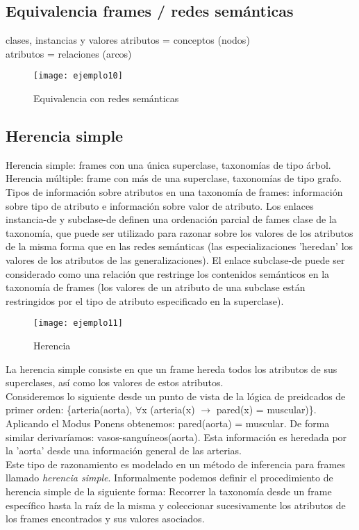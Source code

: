 \documentclass[12pt]{article}
\begin{document}
\subsection{Equivalencia frames / redes semánticas}
clases, instancias y valores atributos = conceptos (nodos)\\
atributos = relaciones (arcos)

\begin{figure}[H]
\centering
\texttt{[image: ejemplo10]}
\caption{Equivalencia con redes semánticas}
\label{fig:ejemplo10}
\end{figure}

\subsection{Herencia simple}
Herencia simple: frames con una única superclase, taxonomías de tipo árbol. Herencia múltiple: frame con más de una superclase, taxonomías de tipo grafo. Tipos de información sobre atributos en una taxonomía de frames: información sobre tipo de atributo e información sobre valor de atributo. Los enlaces instancia-de y subclase-de definen una ordenación parcial de fames clase de la taxonomía, que puede ser utilizado para razonar sobre los valores de los atributos de la misma forma que en las redes semánticas (las especializaciones 'heredan' los valores de los atributos de las generalizaciones). El enlace subclase-de puede ser considerado como una relación que restringe los contenidos semánticos en la taxonomía de frames (los valores de un atributo de una subclase están restringidos por el tipo de atributo especificado en la superclase).

\begin{figure}[H]
\centering
\texttt{[image: ejemplo11]}
\caption{Herencia}
\label{fig:ejemplo11}
\end{figure}

La herencia simple consiste en que un frame hereda todos los atributos de sus superclases, así como los valores de estos atributos.\\
Consideremos lo siguiente desde un punto de vista de la lógica de preidcados de primer orden: \{arteria(aorta), $\forall$x (arteria(x) $\rightarrow$ pared(x) = muscular)\}. Aplicando el Modus Ponens  obtenemos: pared(aorta) = muscular. De forma similar derivaríamos: vasos-sanguíneos(aorta). Esta información es heredada por la 'aorta' desde una información general de las arterias.\\
Este tipo de razonamiento es modelado en un método de inferencia para frames llamado \textit{herencia simple}. Informalmente podemos definir el procedimiento de herencia simple de la siguiente forma: Recorrer la taxonomía desde un frame específico hasta la raíz de la misma y coleccionar sucesivamente los atributos de los frames encontrados y sus valores asociados.
\end{document}
